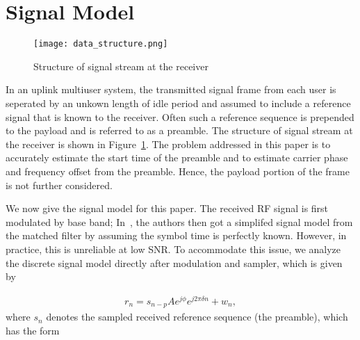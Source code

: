 \section{Signal Model}
\label{sec:model}

\begin{figure}[t]
  \centerline{\texttt{[image: data\_structure.png]}}
  \caption{Structure of signal stream at the receiver}
  \label{fig:data_structure}
  \end{figure}

In an uplink multiuser system, the transmitted signal frame from each user is seperated by an unkown length of idle period and assumed to include a reference signal that is known to the receiver.
Often such a reference sequence is prepended to the payload and is referred to as a preamble.
The structure of signal stream at the receiver is shown in Figure~\ref{fig:data_structure}. 
The problem addressed in this paper is to accurately estimate the start time of the preamble and to estimate carrier phase and frequency offset from the preamble.
Hence, the payload portion of the frame is not further considered. 

We now give the signal model for this paper. The received RF signal is first modulated by base band;
In~\cite{Morelli_Mengali_98,Ramakrishnan_10}, the authors then got a simplifed signal model from the matched filter by assuming the symbol time is perfectly known.
However, in practice, this is unreliable at low SNR. To accommodate this issue, we analyze the discrete signal model
directly after modulation and sampler, which is given by

\begin{equation}
    \begin{aligned}
      \label{eq:model}
      r_n = s_{n-p}Ae^{j\phi}e^{j2\pi\delta n}+w_{n},
    \end{aligned}
  \end{equation}
where $s_n$ denotes the sampled received reference sequence (the preamble), which has the form

